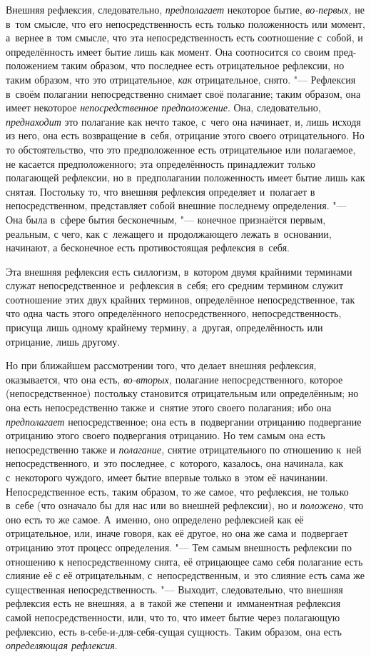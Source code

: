 Внешняя рефлексия, следовательно, {\em предполагает}
некоторое бытие, {\em во-первых,} не в~том смысле, что
его непосредственность есть только положенность или момент, а~вернее в~том
смысле, что эта непосредственность есть соотношение с~собой, и
определённость имеет бытие лишь как момент. Она соотносится со своим
пред-положением таким образом, что последнее есть отрицательное рефлексии,
но таким образом, что это отрицательное, {\em как}
отрицательное, снято. "--- Рефлексия в~своём полагании непосредственно снимает
своё полагание; таким образом, она имеет некоторое
{\em непосредственное предположение}. Она,
следовательно, {\em преднаходит} это полагание как
нечто такое, с~чего она начинает, и, лишь исходя из него, она есть
возвращение в~себя, отрицание этого своего отрицательного. Но то
обстоятельство, что это предположенное есть отрицательное или полагаемое,
не касается предположенного; эта определённость принадлежит только
полагающей рефлексии, но в~предполагании положенность имеет бытие лишь как
снятая. Постольку то, что внешняя рефлексия определяет и~полагает в
непосредственном, представляет собой внешние последнему определения. "--- Она
была в~сфере бытия бесконечным, "--- конечное признаётся первым, реальным, с
чего, как с~лежащего и~продолжающего лежать в~основании, начинают, а
бесконечное есть противостоящая рефлексия в~себя.

Эта внешняя рефлексия есть силлогизм, в~котором двумя крайними терминами
служат непосредственное и~рефлексия в~себя; его средним термином служит
соотношение этих двух крайних терминов, определённое непосредственное, так
что одна часть этого определённого непосредственного, непосредственность,
присуща лишь одному крайнему термину, а~другая, определённость или
отрицание, лишь другому.

Но при ближайшем рассмотрении того, что делает внешняя рефлексия,
оказывается, что она есть, {\em во-вторых,} полагание
непосредственного, которое (непосредственное) постольку становится
отрицательным или определённым; но она есть непосредственно также и~снятие
этого своего полагания; ибо она {\em предполагает}
непосредственное; она есть в~подвергании отрицанию подвергание отрицанию
этого своего подвергания отрицанию. Но тем самым она есть непосредственно
также и {\em полагание,} снятие отрицательного по
отношению к~ней непосредственного, и~это последнее, с~которого, казалось,
она начинала, как с~некоторого чуждого, имеет бытие впервые только в~этом
её начинании. Непосредственное есть, таким образом, то же самое, что
рефлексия, не только в~себе (что означало бы для нас или во внешней
рефлексии), но и {\em положено,} что оно есть то же
самое. А~именно, оно определено рефлексией как её отрицательное, или, иначе
говоря, как её другое, но она же сама и~подвергает отрицанию этот процесс
определения. "--- Тем самым внешность рефлексии по отношению к
непосредственному снята, её отрицающее само себя полагание есть слияние её
с её отрицательным, с~непосредственным, и~это слияние есть сама же
существенная непосредственность. "--- Выходит, следовательно, что внешняя
рефлексия есть не внешняя, а~в такой же степени и~имманентная рефлексия
самой непосредственности, или, что то, что имеет бытие через полагающую
рефлексию, есть в-себе-и-для-себя-сущая сущность. Таким образом, она есть
{\em определяющая рефлексия}.

